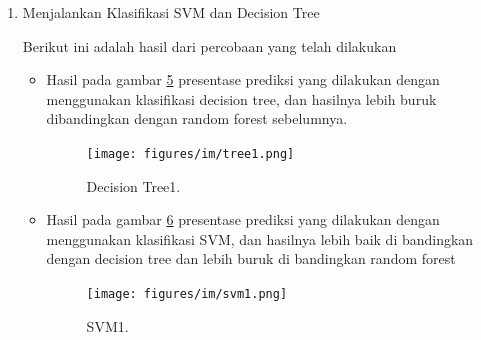 \begin{enumerate}
\begin{itemize}
\item Hasil pada gambar \ref{mat2} untuk menampilkan beberapa hasil dari data sebelumnya
 		\begin{figure}[ht]
		\centerline{\texttt{[image: figures/im/mat2.png]}}
		\caption{Confusion Matrix2.}
		\label{mat2}
		\end{figure}

\item Hasil pada gambar \ref{mat3} untuk merencanakan confusuin matrix dengan matplotlib sebelum di normalisasikan
 		\begin{figure}[ht]
		\centerline{\texttt{[image: figures/im/mat3.png]}}
		\caption{Confusion Matrix3.}
		\label{mat3}
		\end{figure}

\item Hasil pada gambar \ref{mat4} menampilkan file classes yang berisi nama-nama spesies burung 
 		\begin{figure}[ht]
		\centerline{\texttt{[image: figures/im/mat4.png]}}
		\caption{Confusion Matrix4.}
		\label{mat4}
		\end{figure}

\item Hasil pada gambar \ref{mat5} merupakan dari proses normalisasi yang pada step sebelumnya sudah direncanakan
 		\begin{figure}[ht]
		\centerline{\texttt{[image: figures/im/mat5.png]}}
		\caption{Confusion Matrix5.}
		\label{mat5}
		\end{figure}
\end{itemize}

\item Menjalankan Klasifikasi SVM dan Decision Tree \par
Berikut ini adalah hasil dari percobaan yang telah dilakukan
\begin{itemize}
\item Hasil pada gambar \ref{tree1} presentase prediksi yang dilakukan dengan menggunakan klasifikasi decision tree, dan hasilnya lebih buruk dibandingkan dengan random forest sebelumnya.
 		\begin{figure}[ht]
		\centerline{\texttt{[image: figures/im/tree1.png]}}
		\caption{Decision Tree1.}
		\label{tree1}
		\end{figure}

\item Hasil pada gambar \ref{svm1} presentase prediksi yang dilakukan dengan menggunakan klasifikasi SVM, dan hasilnya lebih baik di bandingkan dengan decision tree dan lebih buruk di bandingkan random forest
 		\begin{figure}[ht]
		\centerline{\texttt{[image: figures/im/svm1.png]}}
		\caption{SVM1.}
		\label{svm1}
		\end{figure}
\end{itemize}


\end{enumerate}
